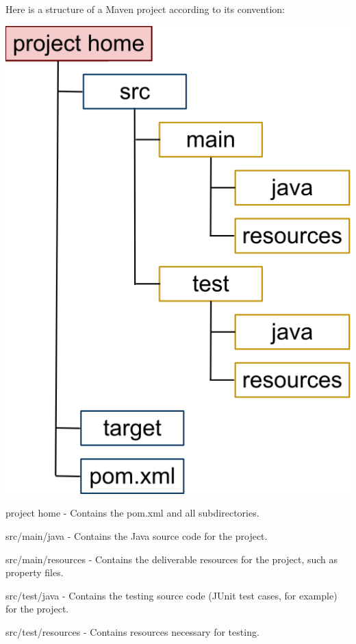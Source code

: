 \documentclass{article}
\begin{document}
Here is a structure of a Maven project according to its convention:
\begin{center}
\includegraphics[scale=0.3]{figures/1}
\end{center}
\begin{compactitem}
\item project home	- Contains the pom.xml and all subdirectories.
\item src/main/java - Contains the Java source code for the project.
\item src/main/resources - Contains the deliverable resources for the project, such as property files.
\item src/test/java - Contains the testing source code (JUnit test cases, for example) for the project.
\item src/test/resources - Contains resources necessary for testing.
\end{compactitem}
\end{document}
